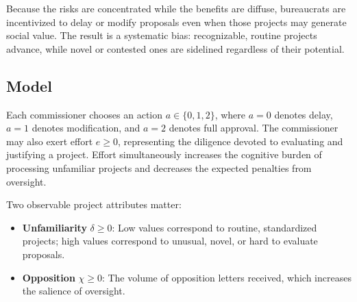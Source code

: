 Because the risks are concentrated while the benefits are diffuse, bureaucrats are incentivized to delay or modify proposals even when those projects may generate social value. The result is a systematic bias: recognizable, routine projects advance, while novel or contested ones are sidelined regardless of their potential.


\subsection{Model}

Each commissioner chooses an action $a \in \{0,1,2\}$, where $a=0$ denotes delay, $a=1$ denotes modification, and $a=2$ denotes full approval. The commissioner may 
also exert effort $e \geq 0$, representing the diligence devoted to evaluating and justifying a project. Effort simultaneously increases the cognitive burden of processing unfamiliar projects and decreases the expected penalties from oversight.

Two observable project attributes matter:

\begin{itemize}
    \item \textbf{Unfamiliarity} $\delta \geq 0$: Low values correspond to routine, standardized projects; high values correspond to unusual, novel, or hard to evaluate proposals.
    \item \textbf{Opposition} $\chi \geq 0$: The volume of opposition letters received, which increases the salience of oversight.
\end{itemize}

